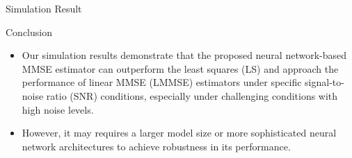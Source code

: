\documentclass[hyperref={bookmarks=false}]{beamer}
\numberwithin{figure}{section}
\begin{document}
\begin{frame}[allowframebreaks]{Simulation Result}

\end{frame}



\begin{frame}{Conclusion}

\begin{itemize}
\item Our simulation results demonstrate that the proposed neural network-based MMSE estimator can outperform the least squares (LS) and approach the performance of 
linear MMSE (LMMSE) estimators under specific signal-to-noise ratio (SNR) conditions, especially under challenging conditions with high noise levels. 

\item However, it may requires a larger model size or more sophisticated neural network architectures to achieve robustness in its performance.
\end{itemize}
\end{frame}
\end{document}
